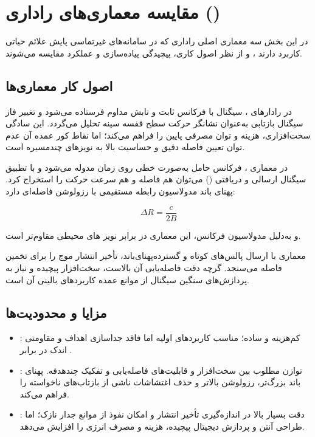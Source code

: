 \section{مقایسه معماری‌های راداری ()}
\label{sec:radar-architecture-comparison}

در این بخش سه معماری اصلی راداری که در سامانه‌های غیرتماسی پایش علائم حیاتی کاربرد دارند ،  و از نظر اصول کاری، پیچیدگی پیاده‌سازی و عملکرد مقایسه می‌شوند.

\subsection{اصول کار معماری‌ها}
\label{sec:principles}

در رادارهای ، سیگنال با فرکانس ثابت و تابش مداوم فرستاده می‌شود و تغییر فاز سیگنال بازتابی به‌عنوان نشانگر حرکت سطح قفسه سینه تحلیل می‌گردد. این سادگی سخت‌افزاری، هزینه و توان مصرفی پایین را فراهم می‌کند؛ اما نقاط کور عمده آن عدم توان تعیین فاصله دقیق و حساسیت بالا به نویزهای چندمسیره است.
\cite{frazao2024radar}

در معماری ، فرکانس حامل به‌صورت خطی روی زمان مدوله می‌شود و با تطبیق سیگنال ارسالی و دریافتی () می‌توان هم فاصله و هم سرعت حرکت را استخراج کرد. پهنای باند مدولاسیون رابطه ­مستقیمی با رزولوشن فاصله‌ای دارد:

\begin{equation}
\Delta R = \frac{c}{2B}
\label{eq:range_resolution_bandwidth}
\end{equation}

و به‌دلیل مدولاسیون فرکانس، این معماری در برابر نویز های محیطی مقاوم‌تر است.
\cite{frazao2024radar}

معماری  با ارسال پالس‌های کوتاه و گسترده‌پهنای‌باند، تأخیر انتشار موج را برای تخمین فاصله می‌سنجد. گرچه دقت فاصله‌یابی آن بالاست، سخت‌افزار پیچیده و نیاز به پردازش‌های سنگین سیگنال از موانع عمده کاربردهای بالینی آن است.
\cite{paterniani2023radar}

\subsection{مزایا و محدودیت‌ها}
\label{sec:advantages-limitations}

\begin{itemize}
    \item \textbf{}: کم‌هزینه و ساده؛ مناسب کاربردهای اولیه اما فاقد جداسازی اهداف و مقاومتی اندک در برابر .
    \item \textbf{}: توازن مطلوب بین سخت‌افزار و قابلیت‌های فاصله‌یابی و تفکیک چندهدفه. پهنای باند بزرگ‌تر، رزولوشن بالاتر و حذف اغتشاشات ناشی از بازتاب‌های ناخواسته را فراهم می‌کند.
    \item \textbf{}: دقت بسیار بالا در اندازه‌گیری تأخیر انتشار و امکان نفوذ از موانع جدار نازک؛ اما طراحی آنتن و پردازش دیجیتال پیچیده، هزینه و مصرف انرژی را افزایش می‌دهد.
\end{itemize}


